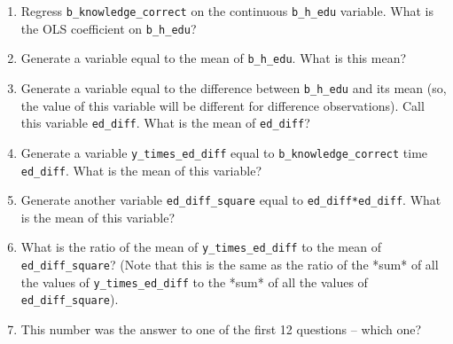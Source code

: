 \documentclass[11pt]{article}
\begin{document}
\begin{enumerate}
\item Regress \texttt{b\_knowledge\_correct} on the continuous \texttt{b\_h\_edu} variable.  What is 
	the OLS coefficient on \texttt{b\_h\_edu}?


\item Generate a variable equal to the mean of \texttt{b\_h\_edu}.  What is this mean?


\item Generate a variable equal to the difference between \texttt{b\_h\_edu} and its mean 
	(so, the value of this variable will be different for difference 
	observations). Call this variable \texttt{ed\_diff}. What is the mean of \texttt{ed\_diff}?


\item Generate a variable \texttt{y\_times\_ed\_diff} equal to \texttt{b\_knowledge\_correct} time 
	\texttt{ed\_diff}.  What is the mean of this variable?


\item Generate another variable \texttt{ed\_diff\_square} equal to \texttt{ed\_diff*ed\_diff}.  What 
	is the mean of this variable?


\item What is the ratio of the mean of \texttt{y\_times\_ed\_diff} to the mean of 
	\texttt{ed\_diff\_square}?  (Note that this is the same as the ratio of the *sum* 
	of all the values of \texttt{y\_times\_ed\_diff} to the *sum* of all the values of 
	\texttt{ed\_diff\_square}).


\item This number was the answer to one of the first 12 questions -- which one?

\end{enumerate}
\end{document}
